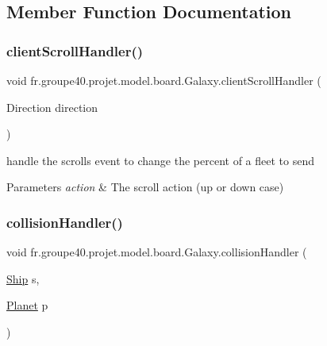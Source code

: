 \subsection{Member Function Documentation}
\mbox{\label{classfr_1_1groupe40_1_1projet_1_1model_1_1board_1_1_galaxy_a1cfe73fa7265d21c8c58162dd42acf58}} 
\subsubsection{\texorpdfstring{client\+Scroll\+Handler()}{clientScrollHandler()}}
{\footnotesize\ttfamily void fr.\+groupe40.\+projet.\+model.\+board.\+Galaxy.\+client\+Scroll\+Handler (\begin{DoxyParamCaption}\item[{Direction}]{direction }\end{DoxyParamCaption})}



handle the scrolls event to change the percent of a fleet to send 


\begin{DoxyParams}{Parameters}
{\em action} & The scroll action (up or down case) \\
\hline
\end{DoxyParams}
\mbox{\label{classfr_1_1groupe40_1_1projet_1_1model_1_1board_1_1_galaxy_a707f976a47503d6afab529da6a36a148}} 
\subsubsection{\texorpdfstring{collision\+Handler()}{collisionHandler()}}
{\footnotesize\ttfamily void fr.\+groupe40.\+projet.\+model.\+board.\+Galaxy.\+collision\+Handler (\begin{DoxyParamCaption}\item[{\hyperlink{classfr_1_1groupe40_1_1projet_1_1model_1_1ships_1_1_ship}{Ship}}]{s,  }\item[{\hyperlink{classfr_1_1groupe40_1_1projet_1_1model_1_1planets_1_1_planet}{Planet}}]{p }\end{DoxyParamCaption})}



